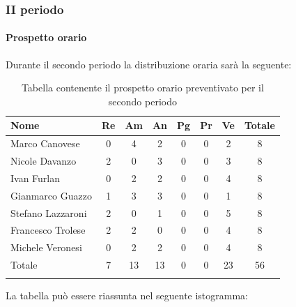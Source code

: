 \subsubsection{II periodo}
\paragraph{Prospetto orario}
Durante il secondo periodo la distribuzione oraria sarà la seguente:

\begin{longtable}{|l|c|c|c|c|c|c|c|}
	\hline
	\rowcolor{lighter-grayer}
	\textbf{Nome}     & \textbf{Re} & \textbf{Am} & \textbf{An} & \textbf{Pg} & \textbf{Pr} & \textbf{Ve} & \textbf{Totale} \\
	\hline
	\endfirsthead

	\hline
	Marco Canovese    & 0           & 4           & 2           & 0           & 0           & 2           & 8               \\
	\hline
	\hline
	Nicole Davanzo    & 2           & 0           & 3           & 0           & 0           & 3           & 8               \\
	\hline
	\hline
	Ivan Furlan       & 0           & 2           & 2           & 0           & 0           & 4           & 8               \\
	\hline
	\hline
	Gianmarco Guazzo  & 1           & 3           & 3           & 0           & 0           & 1           & 8               \\
	\hline
	\hline
	Stefano Lazzaroni & 2           & 0           & 1           & 0           & 0           & 5           & 8               \\
	\hline
	\hline
	Francesco Trolese & 2           & 2           & 0           & 0           & 0           & 4           & 8               \\
	\hline
	\hline
	Michele Veronesi  & 0           & 2           & 2           & 0           & 0           & 4           & 8               \\
	\hline
	\hline
	Totale            & 7           & 13          & 13          & 0           & 0           & 23          & 56              \\
	\hline
	\rowcolor{white}
	\caption{Tabella contenente il prospetto orario preventivato per il secondo periodo}
\end{longtable}


La tabella può essere riassunta nel seguente istogramma:

